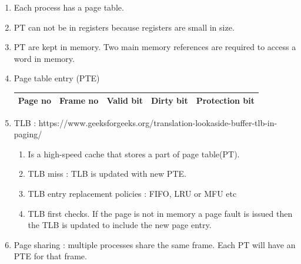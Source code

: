 \begin{enumerate}
  \item Each process has a page table.
  \item PT can not be in registers because registers are small in size.
  \item PT are kept in memory. Two main memory references are required to access a word in memory.
  \item Page table entry (PTE) \\
  \begin{myTableStyle}
    \begin{tabular}{ |m{2cm}|m{2cm}|m{2cm}|m{2cm}|m{3cm}| } \hline
        Page no &  Frame no & Valid bit & Dirty bit & Protection bit  \\ \hline
    \end{tabular}
  \end{myTableStyle}


  \item TLB : https://www.geeksforgeeks.org/translation-lookaside-buffer-tlb-in-paging/
    \begin{enumerate}
      \item Is a high-speed cache that stores a part of page table(PT).
      \item TLB miss : TLB is updated with new PTE.
      \item TLB entry replacement policies : FIFO, LRU or MFU etc
      \item TLB first checks. If the page is not in memory a page fault is issued then the TLB is updated to include the new page entry.
    \end{enumerate}

    \item Page sharing : multiple processes share the same  frame. Each PT will have an PTE for that frame.


\end{enumerate}
